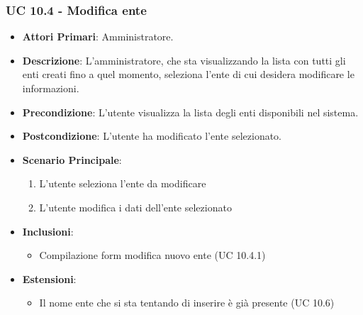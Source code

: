 			\subsubsection{UC 10.4 - Modifica ente}
			\begin{itemize}
				\item \textbf{Attori Primari}: Amministratore.
				\item \textbf{Descrizione}: L'amministratore, che sta visualizzando la lista con tutti gli enti creati fino a quel momento, seleziona l'ente di cui desidera modificare le informazioni. 
				\item \textbf{Precondizione}: L'utente visualizza la lista degli enti disponibili nel sistema.
				\item \textbf{Postcondizione}: L'utente ha modificato l'ente selezionato.
				\item \textbf{Scenario Principale}:
				\begin{enumerate}
					\item{L'utente seleziona l'ente da modificare}
					\item{L'utente modifica i dati dell'ente selezionato}
				\end{enumerate}
				\item \textbf{Inclusioni}:
					\begin{itemize}
						\item Compilazione form modifica nuovo ente (UC 10.4.1)
					\end{itemize}
				\item \textbf{Estensioni}:
					\begin{itemize}
						\item Il nome ente che si sta tentando di inserire è già presente (UC 10.6)
					\end{itemize}
			\end{itemize}	

